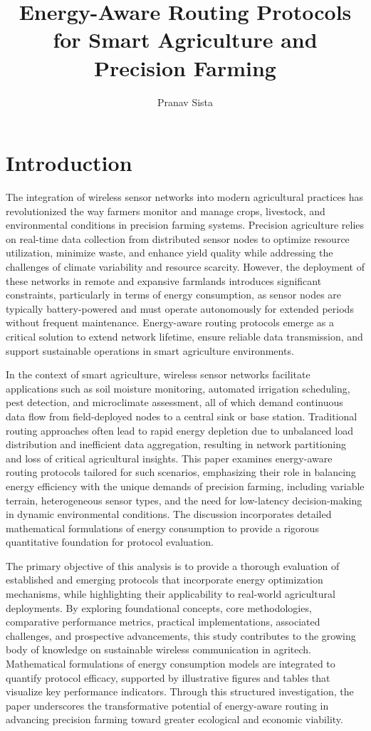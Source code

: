 \documentclass[12pt]{article}
\title{Energy-Aware Routing Protocols for Smart Agriculture and Precision Farming}
\author{Pranav Sista}
\date{}
\begin{document}
\maketitle

\section{Introduction}

The integration of wireless sensor networks into modern agricultural practices has revolutionized the way farmers monitor and manage crops, livestock, and environmental conditions in precision farming systems. Precision agriculture relies on real-time data collection from distributed sensor nodes to optimize resource utilization, minimize waste, and enhance yield quality while addressing the challenges of climate variability and resource scarcity. However, the deployment of these networks in remote and expansive farmlands introduces significant constraints, particularly in terms of energy consumption, as sensor nodes are typically battery-powered and must operate autonomously for extended periods without frequent maintenance. Energy-aware routing protocols emerge as a critical solution to extend network lifetime, ensure reliable data transmission, and support sustainable operations in smart agriculture environments.

In the context of smart agriculture, wireless sensor networks facilitate applications such as soil moisture monitoring, automated irrigation scheduling, pest detection, and microclimate assessment, all of which demand continuous data flow from field-deployed nodes to a central sink or base station. Traditional routing approaches often lead to rapid energy depletion due to unbalanced load distribution and inefficient data aggregation, resulting in network partitioning and loss of critical agricultural insights. This paper examines energy-aware routing protocols tailored for such scenarios, emphasizing their role in balancing energy efficiency with the unique demands of precision farming, including variable terrain, heterogeneous sensor types, and the need for low-latency decision-making in dynamic environmental conditions. The discussion incorporates detailed mathematical formulations of energy consumption to provide a rigorous quantitative foundation for protocol evaluation.

The primary objective of this analysis is to provide a thorough evaluation of established and emerging protocols that incorporate energy optimization mechanisms, while highlighting their applicability to real-world agricultural deployments. By exploring foundational concepts, core methodologies, comparative performance metrics, practical implementations, associated challenges, and prospective advancements, this study contributes to the growing body of knowledge on sustainable wireless communication in agritech. Mathematical formulations of energy consumption models are integrated to quantify protocol efficacy, supported by illustrative figures and tables that visualize key performance indicators. Through this structured investigation, the paper underscores the transformative potential of energy-aware routing in advancing precision farming toward greater ecological and economic viability.
\end{document}
